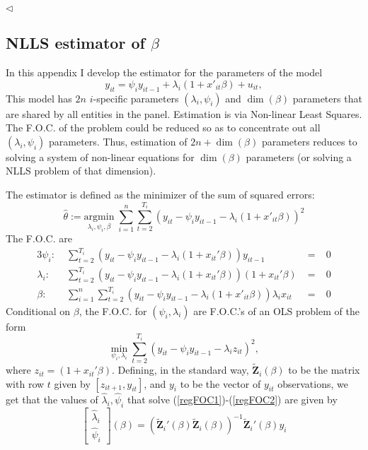 \documentclass[
  12pt,
  pagebackref]{article}
\begin{document}
\begin{flushright}
$\triangleleft$
\end{flushright}

\newpage

\hypertarget{nlls-estimator-of-beta}{%
\subsection{\texorpdfstring{NLLS estimator of
\(\beta\)}{NLLS estimator of \textbackslash beta}}\label{nlls-estimator-of-beta}}

In this appendix I develop the estimator for the parameters of the model
\begin{equation}\label{nonLinearLS}
 y_{it} = \psi_i y_{it-1} + \lambda_i(1+x'_{it}\beta) + u_{it},
\end{equation} This model has \(2n\) \(i\)-specific parameters
\((\lambda_i, \psi_i)\) and \(\dim(\beta)\) parameters that are shared
by all entities in the panel. Estimation is via Non-linear Least
Squares. The F.O.C. of the problem could be reduced so as to concentrate
out all \((\lambda_i,\psi_i)\) parameters. Thus, estimation of
\(2n + \dim(\beta)\) parameters reduces to solving a system of
non-linear equations for \(\dim(\beta)\) parameters (or solving a NLLS
problem of that dimension).

The estimator is defined as the minimizer of the sum of squared errors:
\begin{equation}\label{sse}
 \hat \theta := \underset{\lambda_i, \psi_i, \beta}{\mathrm{argmin}}\;
 \sum_{i=1}^n \sum_{t=2}^{T_i} (y_{it} - \psi_i y_{it-1} - \lambda_i(1+x'_{it}\beta))^2
\end{equation} The F.O.C. are \begin{alignat}{3}
\label{regFOC1} \psi_i:\; & \sum_{t=2}^{T_i} (y_{it} - \psi_iy_{it-1} - \lambda_i(1+x_{it}'\beta))y_{it-1} &\;=\;& 0\\
\label{regFOC2} \lambda_i:\; &\sum_{t=2}^{T_i} (y_{it} - \psi_iy_{it-1} - \lambda_i(1+x_{it}'\beta))(1+x_{it}'\beta) &\;=\;& 0 \\
  \beta:\; & \sum_{i=1}^n \sum_{t=2}^{T_i} (y_{it} - \psi_i y_{it-1} - \lambda_i(1+x'_{it}\beta))\lambda_ix_{it} &\;=\;& 0
\end{alignat} Conditional on \(\beta\), the F.O.C. for
\((\psi_i, \lambda_i)\) are F.O.C.'s of an OLS problem of the form
\[\min_{\psi_i, \lambda_i}\sum_{t=2}^{T_i} (y_{it} - \psi_i y_{it-1} - \lambda_iz_{it})^2,\]
where \(z_{it} = (1+x_{it}'\beta)\). Defining, in the standard way,
\(\tilde{\mathbf Z}_i (\beta)\) to be the matrix with row \(t\) given by
\([z_{it+1}, y_{it}]\), and \(y_i\) to be the vector of \(y_{it}\)
observations, we get that the values of \(\hat \lambda_i,\hat \psi_i\)
that solve (\ref{regFOC1})-(\ref{regFOC2}) are given by
\begin{equation}\label{psilambda}
\begin{bmatrix}
\hat \lambda_i \\
\hat \psi_i
\end{bmatrix}(\beta)
=
(\tilde{\mathbf Z}_i' (\beta)\tilde{\mathbf Z}_i (\beta))^{-1}\tilde{\mathbf Z}_i' (\beta)y_i
\end{equation}
\end{document}
